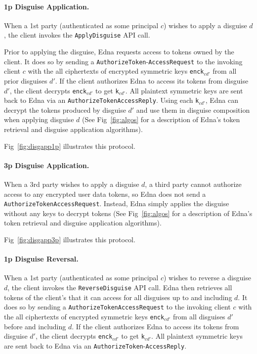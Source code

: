 \paragraph{1p Disguise Application.}
When a 1st party (authenticated as some principal $c$) wishes to apply a disguise $d$, the
client invokes the \texttt{ApplyDisguise} API call. 

Prior to applying the disguise, Edna requests access to tokens owned by the client. It does so by
sending a \texttt{AuthorizeToken}-\texttt{AccessRequest} to the invoking client $c$ with the all ciphertexts of 
encrypted symmetric keys \texttt{enck}$_{cd'}$ from all prior disguises $d'$. If the client
authorizes Edna to access its tokens from disguise $d'$, the client decrypts \texttt{enck}$_{cd'}$
to get \texttt{k}$_{cd'}$. All plaintext symmetric keys are sent back to Edna via an
\texttt{AuthorizeTokenAccessReply}. 
Using each \texttt{k}$_{cd'}$, Edna can decrypt the tokens produced by disguise $d'$ and use them
in disguise composition when applying disguise $d$ (See Fig~\ref{fig:algos} for a description of Edna's
token retrieval and disguise application algorithms).

Fig~\ref{fig:disgapp1p} illustrates this protocol.

\paragraph{3p Disguise Application.}
When a 3rd party wishes to apply a disguise $d$, a third party cannot authorize access to any encrypted user data tokens, so Edna does not
send a \texttt{AuthorizeToken}\texttt{AccessRequest}. Instead, Edna simply applies the disguise  
without any keys to decrypt tokens (See Fig~\ref{fig:algos} for a description of Edna's
token retrieval and disguise application algorithms).

Fig~\ref{fig:disgapp3p} illustrates this protocol.

\paragraph{1p Disguise Reversal.}
When a 1st party (authenticated as some principal $c$) wishes to reverse a disguise $d$, the client
invokes the \texttt{ReverseDisguise} API call. Edna then retrieves all tokens of the client's that
it can access for all disguises up to and including $d$. It does so by sending a
\texttt{AuthorizeToken}\texttt{AccessRequest} to the invoking client $c$ with the all ciphertexts of
encrypted symmetric keys \texttt{enck}$_{cd'}$ from all disguises $d'$ before and including $d$. If
the client authorizes Edna to access its tokens from disguise $d'$, the client decrypts
\texttt{enck}$_{cd'}$ to get \texttt{k}$_{cd'}$. All plaintext symmetric keys are sent back to Edna
via an \texttt{AuthorizeToken}-\texttt{AccessReply}. 

